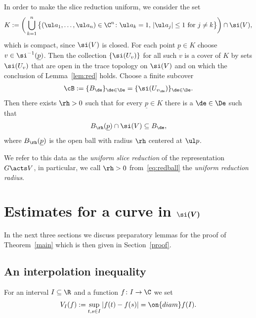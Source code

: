 In order to make the slice reduction uniform, we consider
the set
\begin{gather} \label{eq:compactK}
 K:= \bigg(\bigcup_{k=1}^n \big\{(\ul a_1, \dots,\ul a_n) \in \C^{n} \colon \ul a_k=1,\,|\ul a_j| \le 1 \text{ for }j \ne k\big\}\bigg) \cap \si(V),
\end{gather}
which is compact, since $\si(V)$ is closed. For each point $\underline p \in K$ choose $v \in \si^{-1}(\underline p)$.
Then the collection $\{\si(U_v)\}$ for all such $v$ is a cover of $K$ by sets $\si(U_v)$ that are open in the
trace topology on $\si(V)$
and on which
the conclusion of Lemma~\ref{lem:red} holds.
Choose a finite subcover
\begin{gather*} %
 \cB := \{B_\de\}_{\de \in \De} = \{\si(U_{v_\de})\}_{\de \in \De}.
\end{gather*}
Then there exists $\rh>0$ such that for every $\underline p \in K$ there is a $\de \in \De$ such that
\begin{gather} \label{eq:redball}
 B_\rh(\underline p) \cap \si(V) \subseteq B_{\de},
\end{gather}
where $B_\rh(\underline p)$ is the open ball with radius $\rh$ centered at $\ul p$.

\begin{Definition}
We refer to this data as the \emph{uniform slice reduction} of the representation~$G \acts V$,
in particular, we call $\rh>0$ from~\eqref{eq:redball} the \emph{uniform reduction radius}.
\end{Definition}

\section[Estimates for a curve in sigma(V)]{Estimates for a curve in $\boldsymbol{\si(V)}$} \label{aestimates}

In the next three sections we discuss preparatory lemmas for the proof of Theorem~\ref{main} which is then
given in Section~\ref{proof}.

\subsection{An interpolation inequality}
For an interval $I \subseteq \R$ and a function $f \colon I \to \C$ we set
\begin{gather*}
 V_I(f) := \sup_{t,s \in I} |f(t)-f(s)| = \on{diam} f(I).
\end{gather*}

